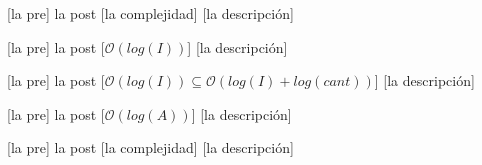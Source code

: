 \begin{Interfaz}
    [la pre]
    {la post}
    [la complejidad]
    [la descripción]
    
    [la pre]
    {la post}
    [$\mathcal{O}(log(I))$]
    [la descripción]
    
    [la pre]
    {la post}
    [$\mathcal{O}(log(I)) \subseteq \mathcal{O}(log(I)+log(cant))$]
    [la descripción]
    
    [la pre]
    {la post}
    [$\mathcal{O}(log(A))$]
    [la descripción]
    
    [la pre]
    {la post}
    [la complejidad]
    [la descripción]

\end{Interfaz}